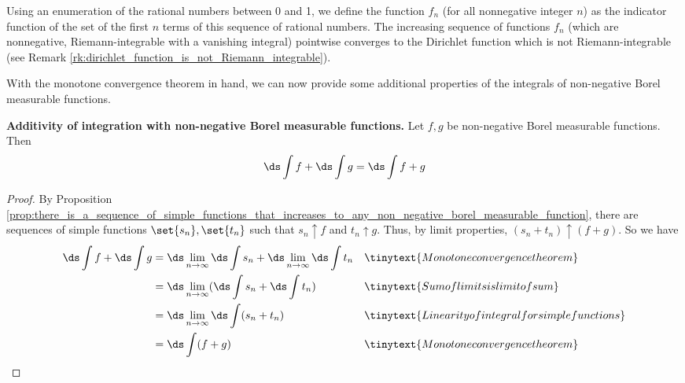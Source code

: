 \documentclass{article} %
\begin{document}
\begin{remark}{}
Using an enumeration of the rational numbers between 0 and 1, we define the function $f_n$ (for all nonnegative integer $n$) as the indicator function of the set of the first $n$ terms of this sequence of rational numbers. The increasing sequence of functions $f_n$ (which are nonnegative, Riemann-integrable with a vanishing integral) pointwise converges to the Dirichlet function which is not Riemann-integrable (see Remark \ref{rk:dirichlet_function_is_not_Riemann_integrable}).
\end{remark}


With the monotone convergence theorem in hand, we can now provide some additional properties of the integrals of non-negative Borel measurable functions.

\begin{proposition}{\textbf{Additivity of integration with non-negative Borel measurable functions.}}
Let $f, g$ be non-negative Borel measurable functions. Then
\[ \ds\int f + \ds\int g = \ds\int f+g \]
\label{prop:additivity_of_integral_for_non_negative_Borel_measurable_functions}
\end{proposition}

\begin{proof}
By Proposition \ref{prop:there_is_a_sequence_of_simple_functions_that_increases_to_any_non_negative_borel_measurable_function}, there are sequences of simple functions $\set{s_n}, \set{t_n}$ such that $s_n \uparrow f$ and $t_n \uparrow g$.   Thus, by limit properties, $(s_n + t_n) \uparrow (f+g)$.  So we have
\begin{align*}
	\ds\int f + \ds\int g &=\ds\lim_{n \to \infty} \ds\int s_n + \ds\lim_{n \to \infty} \ds\int t_n && \tinytext{Monotone convergence theorem} \\
	&= \ds\lim_{n \to \infty} ( \ds\int s_n +  \ds\int t_n ) && \tinytext{Sum of limits is limit of sum} \\
	&=  \ds\lim_{n \to \infty} \ds\int (s_n + t_n)  && \tinytext{Linearity of integral for simple functions}\\
	&= \ds\int (f+g)  && \tinytext{Monotone convergence theorem}
 \end{align*}
\end{proof}
\end{document}
